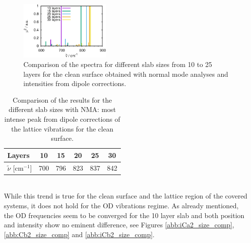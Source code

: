 \documentclass[11pt,DIV=13,BCOR=5mm,a4paper,headinclude]{scrbook}
\begin{document}
\begin{figure}
 \centering
 \includegraphics[width=0.4\textwidth]{figures/11-20/comp_freq_surf.eps}
 \caption{Comparison of the spectra for different slab sizes from 10 to 25 layers for the clean surface obtained with normal mode analyses and intensities from dipole corrections.}
 \label{abb:clean_comp_layer}
\end{figure}
\begin{table}[!h]
  \centering
 \caption{Comparison of the results for the different slab sizes with NMA: most intense peak from dipole corrections of the lattice vibrations for the clean surface.}
\vspace*{.2cm} 
  \begin{tabular}{l|ccccc}
  \toprule
Layers& 10&15&20&25&30 \\\midrule
$\tilde{\nu}$ [cm$^{-1}$] &700 &796& 823&837 & 842\\\bottomrule
  \end{tabular}
  \label{tab:comp_norm-modes_clean}
\end{table}
\\
While this trend is true for the clean surface and the lattice region of the covered systems, it does not hold for the OD vibrations regime.
As already mentioned, the OD frequencies seem to be converged for the 10 layer slab and both position and intensity show no eminent difference, see Figures \ref{abb:iCa2_size_comp}, \ref{abb:Cb2_size_comp} and \ref{abb:iCb2_size_comp}.
\end{document}
